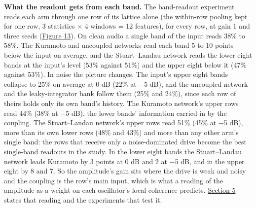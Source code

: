 \documentclass{article}
\begin{document}
\textbf{What the readout gets from each band.} The band-readout
experiment reads each arm through one row of its lattice alone (the
within-row pooling kept for one row, 3 statistics \ensuremath{\times} 4
windows = 12 features), for every row, at gain 1 and three seeds
(\hyperref[fig-fig16-appD2-band-readout]{Figure 13}). On clean audio a
single band of the input reads 38\% to 58\%. The Kuramoto and uncoupled
networks read each band 5 to 10 points below the input on average, and
the Stuart--Landau network reads the lower eight bands at the input's
level (53\% against 51\%) and the upper eight below it (47\% against
53\%). In noise the picture changes. The input's upper eight bands
collapse to 25\% on average at 0 dB (22\% at \ensuremath{-}5 dB), and
the uncoupled network and the leaky-integrator bank follow them (25\%
and 24\%), since each row of theirs holds only its own band's history.
The Kuramoto network's upper rows read 44\% (38\% at \ensuremath{-}5
dB), the lower bands' information carried in by the coupling. The
Stuart--Landau network's upper rows read 51\% (45\% at \ensuremath{-}5
dB), more than its own lower rows (48\% and 43\%) and more than any
other arm's single band: the rows that receive only a noise-dominated
drive become the best single-band readouts in the study. In the lower
eight bands the Stuart--Landau network leads Kuramoto by 3 points at 0
dB and 2 at \ensuremath{-}5 dB, and in the upper eight by 8 and 7. So
the amplitude's gain sits where the drive is weak and noisy and the
coupling is the row's main input, which is what a reading of the
amplitude as a weight on each oscillator's local coherence predicts.
\hyperref[sec-5]{Section 5} states that reading and the experiments that
test it.
\end{document}

